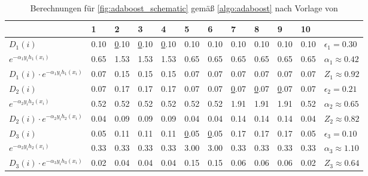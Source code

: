 \begin{table}[H]
    \caption[Berechnungen für \autoref{fig:adaboost_schematic}]{Berechnungen für \autoref{fig:adaboost_schematic} gemäß \autoref{algo:adaboost} nach Vorlage von \textcite[Tabelle 1.1][S.~9]{SchapireFreund2012}}
    \label{tab:adaboost_schematic}
    \begin{tabular}{l|llllllllll|l}
    \hline
                                                  & 1    & 2          & 3          & 4          & 5          & 6          & 7          & 8          & 9          & 10   &                             \\ \hline
    \( D_1(i) \)                                  & 0.10 & {\ul 0.10} & {\ul 0.10} & {\ul 0.10} & 0.10       & 0.10       & 0.10       & 0.10       & 0.10       & 0.10 & \( \epsilon_1 = 0.30 \)     \\
    \( e^{-\alpha_1 y_i h_1(x_i)} \)              & 0.65 & 1.53       & 1.53       & 1.53       & 0.65       & 0.65       & 0.65       & 0.65       & 0.65       & 0.65 & \( \alpha_1 \approx 0.42 \) \\
    \( D_1(i) \cdot e^{-\alpha_1 y_i h_1(x_i)} \) & 0.07 & 0.15       & 0.15       & 0.15       & 0.07       & 0.07       & 0.07       & 0.07       & 0.07       & 0.07 & \( Z_1 \approx 0.92 \)      \\ \hline
    \( D_2(i) \)                                  & 0.07 & 0.17       & 0.17       & 0.17       & 0.07       & 0.07       & {\ul 0.07} & {\ul 0.07} & {\ul 0.07} & 0.07 & \( \epsilon_2 = 0.21 \)     \\
    \( e^{-\alpha_2 y_i h_2(x_i)} \)              & 0.52 & 0.52       & 0.52       & 0.52       & 0.52       & 0.52       & 1.91       & 1.91       & 1.91       & 0.52 & \( \alpha_2 \approx 0.65 \) \\
    \( D_2(i) \cdot e^{-\alpha_2 y_i h_2(x_i)} \) & 0.04 & 0.09       & 0.09       & 0.09       & 0.04       & 0.04       & 0.14       & 0.14       & 0.14       & 0.04 & \( Z_2 \approx 0.82 \)      \\ \hline
    \( D_3(i) \)                                  & 0.05 & 0.11       & 0.11       & 0.11       & {\ul 0.05} & {\ul 0.05} & 0.17       & 0.17       & 0.17       & 0.05 & \( \epsilon_3 = 0.10 \)     \\
    \( e^{-\alpha_2 y_i h_2(x_i)} \)              & 0.33 & 0.33       & 0.33       & 0.33       & 3.00       & 3.00       & 0.33       & 0.33       & 0.33       & 0.33 & \( \alpha_3 \approx 1.10 \) \\
    \( D_3(i) \cdot e^{-\alpha_3 y_i h_3(x_i)} \) & 0.02 & 0.04       & 0.04       & 0.04       & 0.15       & 0.15       & 0.06       & 0.06       & 0.06       & 0.02 & \( Z_3 \approx 0.64 \)      \\ \hline
    \end{tabular}
\end{table}

